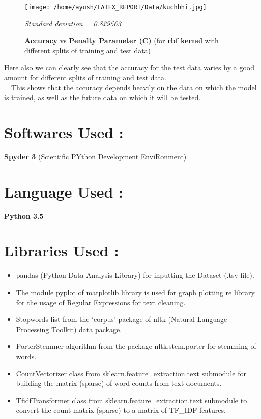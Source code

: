 \documentclass{report}
\begin{document}
\begin{figure}[!h]
  \texttt{[image: /home/ayush/LATEX\_REPORT/Data/kuchbhi.jpg]}
  \caption{\textbf{Accuracy }vs\textbf{ Penalty Parameter (C)} (for \textbf{rbf kernel} with different splits of training and test data)}
  \label{fig:}
  \emph{\normalsize Standard deviation = 0.829563}
\end{figure}

Here also we can clearly see that the accuracy for the test data varies by a good amount for different splits of training and test data.\\
\linebreak
\ \ This shows that the accuracy depends heavily on the data on which the model is trained, as well as the future data on which it will be tested. 
\pagebreak
\begin{multicols}{2}
\section{\huge Softwares Used :}
\textbf{Spyder 3} (Scientific PYthon Development EnviRonment)
\section{\huge Language Used :}
\textbf{Python 3.5}
\section{\huge Libraries Used :}
\begin{itemize}
\item pandas (Python Data Analysis Library) for inputting the Dataset (.tsv file).

\item The module pyplot of matplotlib library is used for graph plotting
re library for the usage of Regular Expressions for text cleaning.

\item Stopwords list from the ‘corpus’ package of nltk (Natural Language Processing Toolkit) data package.

\item PorterStemmer algorithm from the package nltk.stem.porter for stemming of words.

\item CountVectorizer class from sklearn.feature\_extraction.text submodule for building the matrix (sparse) of word counts from text documents.

\item TfidfTransformer class from sklearn.feature\_extraction.text submodule to convert the count matrix (sparse) to a matrix of TF\_IDF features.


\end{itemize}
\end{multicols}
\end{document}
